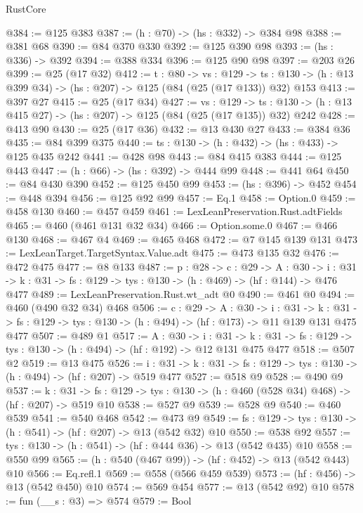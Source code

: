 \begin{lexlean}{RustCore}
\begin{coremodule}
@384 := @125 @383
@387 := (h : @70) -> (hs : @332) -> @384 @98
@388 := @381 @68
@390 := @84 @370 @330
@392 := @125 @390 @98
@393 := (hs : @336) -> @392
@394 := @388 @334
@396 := @125 @90 @98
@397 := @203 @26
@399 := @25 (@17 @32)
@412 := {t : @80} ->
  {vs : @129} ->
  {ts : @130} -> (h : @13 @399 @34) -> (hs : @207) -> @125 (@84 (@25 (@17 @133)) @32) @153
@413 := @397 @27
@415 := @25 (@17 @34)
@427 := {vs : @129} ->
  {ts : @130} -> (h : @13 @415 @27) -> (hs : @207) -> @125 (@84 (@25 (@17 @135)) @32) @242
@428 := @413 @90
@430 := @25 (@17 @36)
@432 := @13 @430 @27
@433 := @384 @36
@435 := @84 @399 @375
@440 := {ts : @130} -> (h : @432) -> (hs : @433) -> @125 @435 @242
@441 := @428 @98
@443 := @84 @415 @383
@444 := @125 @443
@447 := (h : @66) -> (hs : @392) -> @444 @99
@448 := @441 @64
@450 := @84 @430 @390
@452 := @125 @450 @99
@453 := (hs : @396) -> @452
@454 := @448 @394
@456 := @125 @92 @99
@457 := Eq.{1}
@458 := Option.{0}
@459 := @458 @130
@460 := @457 @459
@461 := LexLeanPreservation.Rust.adtFields
@465 := @460 (@461 @131 @32 @34)
@466 := Option.some.{0}
@467 := @466 @130
@468 := @467 @4
@469 := @465 @468
@472 := @7 @145 @139 @131
@473 := LexLeanTarget.TargetSyntax.Value.adt
@475 := @473 @135 @32
@476 := @472 @475
@477 := @8 @133
@487 := {p : @28} ->
  {c : @29} ->
  {A : @30} ->
  {i : @31} -> {k : @31} -> {fs : @129} -> {tys : @130} -> (h : @469) -> (hf : @144) -> @476 @477
@489 := LexLeanPreservation.Rust.wt_adt @0
@490 := @461 @0
@494 := @460 (@490 @32 @34) @468
@506 := {c : @29} ->
  {A : @30} ->
  {i : @31} ->
  {k : @31} -> {fs : @129} -> {tys : @130} -> (h : @494) -> (hf : @173) -> @11 @139 @131 @475 @477
@507 := @489 @1
@517 := {A : @30} ->
  {i : @31} ->
  {k : @31} -> {fs : @129} -> {tys : @130} -> (h : @494) -> (hf : @192) -> @12 @131 @475 @477
@518 := @507 @2
@519 := @13 @475
@526 := {i : @31} ->
  {k : @31} -> {fs : @129} -> {tys : @130} -> (h : @494) -> (hf : @207) -> @519 @477
@527 := @518 @9
@528 := @490 @9
@537 := {k : @31} ->
  {fs : @129} -> {tys : @130} -> (h : @460 (@528 @34) @468) -> (hf : @207) -> @519 @10
@538 := @527 @9
@539 := @528 @9
@540 := @460 @539
@541 := @540 @468
@542 := @473 @9
@549 := {fs : @129} -> {tys : @130} -> (h : @541) -> (hf : @207) -> @13 (@542 @32) @10
@550 := @538 @92
@557 := {tys : @130} -> (h : @541) -> (hf : @444 @36) -> @13 (@542 @435) @10
@558 := @550 @99
@565 := (h : @540 (@467 @99)) -> (hf : @452) -> @13 (@542 @443) @10
@566 := Eq.refl.{1}
@569 := @558 (@566 @459 @539)
@573 := (hf : @456) -> @13 (@542 @450) @10
@574 := @569 @454
@577 := @13 (@542 @92) @10
@578 := fun (__s : @3) => @574
@579 := Bool

\end{coremodule}
\end{lexlean}
